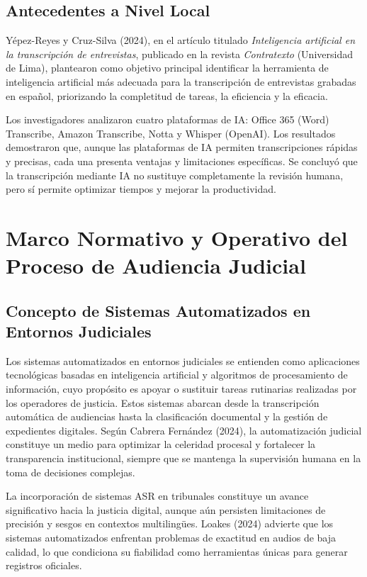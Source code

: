 \documentclass[12pt,a4paper,oneside]{report}
\begin{document}
\subsection{Antecedentes a Nivel Local}

Yépez-Reyes y Cruz-Silva (2024), en el artículo titulado \textit{Inteligencia artificial en la transcripción de entrevistas}, publicado en la revista \textit{Contratexto} (Universidad de Lima), plantearon como objetivo principal identificar la herramienta de inteligencia artificial más adecuada para la transcripción de entrevistas grabadas en español, priorizando la completitud de tareas, la eficiencia y la eficacia.

Los investigadores analizaron cuatro plataformas de IA: Office 365 (Word) Transcribe, Amazon Transcribe, Notta y Whisper (OpenAI). Los resultados demostraron que, aunque las plataformas de IA permiten transcripciones rápidas y precisas, cada una presenta ventajas y limitaciones específicas. Se concluyó que la transcripción mediante IA no sustituye completamente la revisión humana, pero sí permite optimizar tiempos y mejorar la productividad.

\section{Marco Normativo y Operativo del Proceso de Audiencia Judicial}

\subsection{Concepto de Sistemas Automatizados en Entornos Judiciales}

Los sistemas automatizados en entornos judiciales se entienden como aplicaciones tecnológicas basadas en inteligencia artificial y algoritmos de procesamiento de información, cuyo propósito es apoyar o sustituir tareas rutinarias realizadas por los operadores de justicia. Estos sistemas abarcan desde la transcripción automática de audiencias hasta la clasificación documental y la gestión de expedientes digitales. Según Cabrera Fernández (2024), la automatización judicial constituye un medio para optimizar la celeridad procesal y fortalecer la transparencia institucional, siempre que se mantenga la supervisión humana en la toma de decisiones complejas.

La incorporación de sistemas ASR en tribunales constituye un avance significativo hacia la justicia digital, aunque aún persisten limitaciones de precisión y sesgos en contextos multilingües. Loakes (2024) advierte que los sistemas automatizados enfrentan problemas de exactitud en audios de baja calidad, lo que condiciona su fiabilidad como herramientas únicas para generar registros oficiales.
\end{document}

